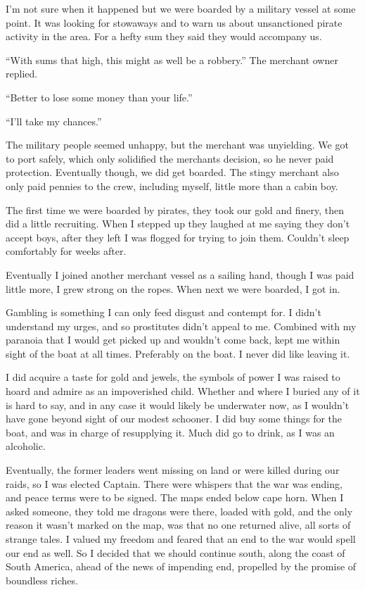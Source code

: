 I’m not sure when it happened but we were boarded by a military vessel at some point. It was looking for stowaways and to warn us about unsanctioned pirate activity in the area. For a hefty sum they said they would accompany us.

“With sums that high, this might as well be a robbery.” The merchant owner replied.

“Better to lose some money than your life.”

“I’ll take my chances.”

The military people seemed unhappy, but the merchant was unyielding.  We got to port safely, which only solidified the merchants decision, so he never paid protection.  Eventually though, we did get boarded.   The stingy merchant also only paid pennies to the crew, including myself, little more than a cabin boy.

The first time we were boarded by pirates, they took our gold and finery, then did a little recruiting. When I stepped up they laughed at me saying they don’t accept boys, after they left I was flogged for trying to join them.  Couldn’t sleep comfortably for weeks after.

Eventually I joined another merchant vessel as a sailing hand, though I was paid little more, I grew strong on the ropes.  When next we were boarded, I got in.

Gambling is something I can only feed disgust and contempt for. I didn’t
understand my urges, and so prostitutes didn’t appeal to me. 
Combined with my paranoia that I would get picked up and wouldn’t come back, 
kept me within sight of the boat at all times. Preferably on the boat.  
I never did like leaving it.

I did acquire a taste for gold and jewels, the symbols of power I was raised to hoard and admire as an impoverished child. Whether and where I buried any of it is hard to say, and in any case it would likely be underwater now, as I wouldn’t have gone beyond sight of our modest schooner.  I did buy some things for the boat, and was in charge of resupplying it.  Much did go to drink, as I was an alcoholic.

Eventually, the former leaders went missing on land or were killed during our raids, so I was elected Captain.  There were whispers that the war was ending, and peace terms were to be signed. The maps ended below cape horn. When I asked someone, they told me dragons were there, loaded with gold, and the only reason it wasn’t marked on the map, was that no one returned alive, all sorts of strange tales.  I valued my freedom and feared that an end to the war would spell our end as well. So I decided that we should continue south, along the coast of South America, ahead of the news of impending end, propelled by the promise of boundless riches.

